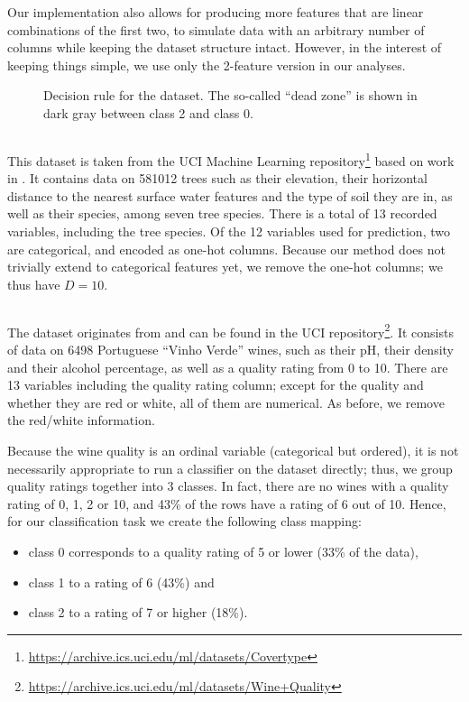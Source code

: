 \documentclass[../main.tex]{subfiles}
\begin{document}
Our implementation also allows for producing more features that are linear combinations of the first two, to simulate data with an arbitrary number of columns while keeping the dataset structure intact.
However, in the interest of keeping things simple, we use only the 2-feature version in our analyses.

\begin{figure}[h]
    \centering

\caption{Decision rule for the \CakeOnSea dataset. The so-called ``dead zone'' is shown in dark gray between class 2 and class 0.}
    \label{fig:cake_on_sea}
\end{figure}

\subsection{\ForestCover}

This dataset is taken from the UCI Machine Learning repository\footnote{\url{https://archive.ics.uci.edu/ml/datasets/Covertype}} \cite{duaUCI2019} based on work in \cite{blackardComparative1999}.
It contains data on 581012 trees such as their elevation, their horizontal distance to the nearest surface water features and the type of soil they are in, as well as their species, among seven tree species. There is a total of 13 recorded variables, including the tree species. Of the 12 variables used for prediction, two are categorical, and encoded as one-hot columns.
Because our method does not trivially extend to categorical features yet, we remove the one-hot columns; we thus have $D = 10$.

\subsection{\WineQuality}

The \WineQuality{} dataset originates from \cite{cortezModeling2009} and can be found in the UCI repository\footnote{\url{https://archive.ics.uci.edu/ml/datasets/Wine+Quality}}.
It consists of data on 6498 Portuguese ``Vinho Verde'' wines, such as their pH, their density and their alcohol percentage, as well as a quality rating from 0 to 10.
There are 13 variables including the quality rating column; except for the quality and whether they are red or white, all of them are numerical.
As before, we remove the red/white information.

Because the wine quality is an ordinal variable (categorical but ordered), it is not necessarily appropriate to run a classifier on the dataset directly;
thus, we group quality ratings together into 3 classes.
In fact, there are no wines with a quality rating of 0, 1, 2 or 10, and 43\% of the rows have a rating of 6 out of 10.
Hence, for our classification task we create the following class mapping:
\begin{itemize}
    \item class 0 corresponds to a quality rating of 5 or lower (33\% of the data),
    \item class 1 to a rating of 6 (43\%) and
    \item class 2 to a rating of 7 or higher (18\%).
\end{itemize}
\end{document}
